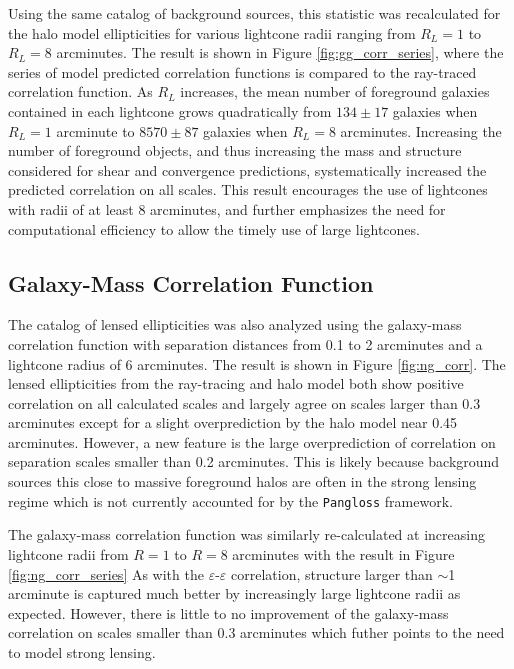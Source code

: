 \documentclass[%
 reprint,
 amsmath,amssymb,
 aps,nofootinbib
]{revtex4-1}
\begin{document}
Using the same catalog of background sources, this statistic was recalculated for the halo model ellipticities for various lightcone radii ranging from $R_L=1$ to $R_L=8$ arcminutes. The result is shown in Figure \ref{fig:gg_corr_series}, where the series of model predicted correlation functions is compared to the ray-traced correlation function. As $R_L$ increases, the mean number of foreground galaxies contained in each lightcone grows quadratically from ${134\pm17}$ galaxies when $R_L=1$ arcminute to ${8570\pm87}$ galaxies when $R_L=8$ arcminutes. Increasing the number of foreground objects, and thus increasing the mass and structure considered for shear and convergence predictions, systematically increased the predicted correlation on all scales. This result encourages the use of lightcones with radii of at least 8 arcminutes, and further emphasizes the need for computational efficiency to allow the timely use of large lightcones.


\subsection{Galaxy-Mass Correlation Function}

The catalog of lensed ellipticities was also analyzed using the galaxy-mass correlation function with separation distances from 0.1 to 2 arcminutes and a lightcone radius of 6 arcminutes. The result is shown in Figure \ref{fig:ng_corr}. The lensed ellipticities from the ray-tracing and halo model both show positive correlation on all calculated scales and largely agree on scales larger than 0.3 arcminutes except for a slight overprediction by the halo model near 0.45 arcminutes. However, a new feature is the large overprediction of correlation on separation scales smaller than 0.2 arcminutes. This is likely because background sources this close to massive foreground halos are often in the strong lensing regime which is not currently accounted for by the \texttt{Pangloss} framework.

The galaxy-mass correlation function was similarly re-calculated at increasing lightcone radii from $R=1$ to $R=8$ arcminutes with the result in Figure \ref{fig:ng_corr_series} As with the $\varepsilon$-$\varepsilon$ correlation, structure larger than $\sim$1 arcminute is captured much better by increasingly large lightcone radii as expected. However, there is little to no improvement of the galaxy-mass correlation on scales smaller than 0.3 arcminutes which futher points to the need to model strong lensing.
\end{document}
